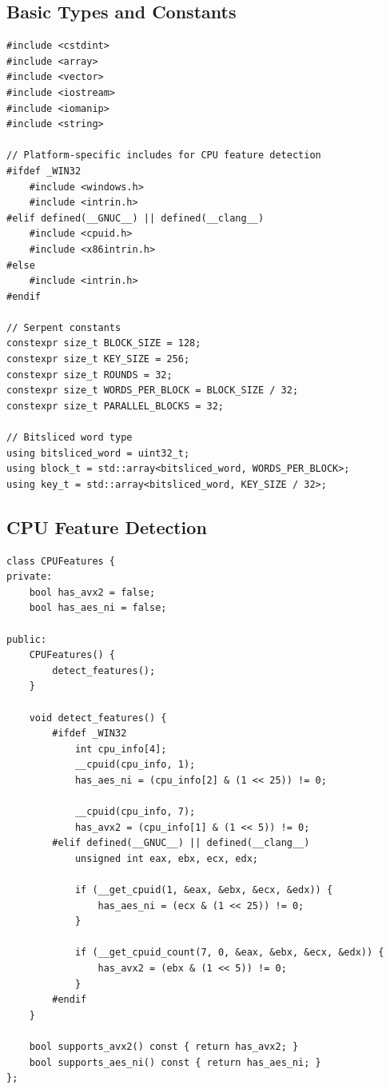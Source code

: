 \documentclass[12pt,a4paper]{article}
\begin{document}
\subsection{Basic Types and Constants}

\begin{lstlisting}[caption=Basic Types and Constants]
#include <cstdint>
#include <array>
#include <vector>
#include <iostream>
#include <iomanip>
#include <string>

// Platform-specific includes for CPU feature detection
#ifdef _WIN32
    #include <windows.h>
    #include <intrin.h>
#elif defined(__GNUC__) || defined(__clang__)
    #include <cpuid.h>
    #include <x86intrin.h>
#else
    #include <intrin.h>
#endif

// Serpent constants
constexpr size_t BLOCK_SIZE = 128;
constexpr size_t KEY_SIZE = 256;
constexpr size_t ROUNDS = 32;
constexpr size_t WORDS_PER_BLOCK = BLOCK_SIZE / 32;
constexpr size_t PARALLEL_BLOCKS = 32;

// Bitsliced word type
using bitsliced_word = uint32_t;
using block_t = std::array<bitsliced_word, WORDS_PER_BLOCK>;
using key_t = std::array<bitsliced_word, KEY_SIZE / 32>;
\end{lstlisting}

\subsection{CPU Feature Detection}

\begin{lstlisting}[caption=Cross-Platform CPU Feature Detection]
class CPUFeatures {
private:
    bool has_avx2 = false;
    bool has_aes_ni = false;

public:
    CPUFeatures() {
        detect_features();
    }

    void detect_features() {
        #ifdef _WIN32
            int cpu_info[4];
            __cpuid(cpu_info, 1);
            has_aes_ni = (cpu_info[2] & (1 << 25)) != 0;
            
            __cpuid(cpu_info, 7);
            has_avx2 = (cpu_info[1] & (1 << 5)) != 0;
        #elif defined(__GNUC__) || defined(__clang__)
            unsigned int eax, ebx, ecx, edx;
            
            if (__get_cpuid(1, &eax, &ebx, &ecx, &edx)) {
                has_aes_ni = (ecx & (1 << 25)) != 0;
            }
            
            if (__get_cpuid_count(7, 0, &eax, &ebx, &ecx, &edx)) {
                has_avx2 = (ebx & (1 << 5)) != 0;
            }
        #endif
    }

    bool supports_avx2() const { return has_avx2; }
    bool supports_aes_ni() const { return has_aes_ni; }
};
\end{lstlisting}
\end{document}
